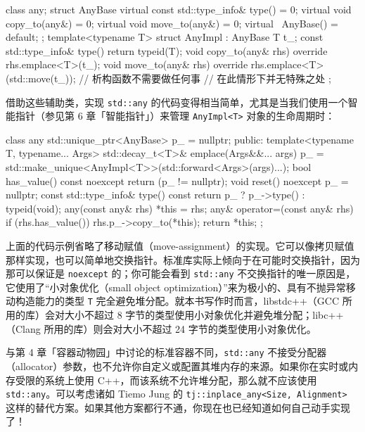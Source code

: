 \begin{codebox}[cpp]
    class any;
    struct AnyBase {
      virtual const std::type_info& type() = 0;
      virtual void copy_to(any&) = 0;
      virtual void move_to(any&) = 0;
      virtual ~AnyBase() = default;
    };
    template<typename T>
    struct AnyImpl : AnyBase {
      T t_;
      const std::type_info& type() {
        return typeid(T);
      }
      void copy_to(any& rhs) override {
        rhs.emplace<T>(t_);
      }
      void move_to(any& rhs) override {
        rhs.emplace<T>(std::move(t_));
      }
      // 析构函数不需要做任何事
      // 在此情形下并无特殊之处
    };
\end{codebox}

借助这些辅助类，实现 \texttt{std::\allowbreak{}any} 的代码变得相当简单，尤其是当我们使用一个智能指针（参见第 6 章「智能指针」）来管理 \texttt{Any\allowbreak{}Impl<\allowbreak{}T>\allowbreak{}} 对象的生命周期时：

\begin{codebox}[cpp]
    class any {
      std::unique_ptr<AnyBase> p_ = nullptr;
      public:
      template<typename T, typename... Args>
      std::decay_t<T>& emplace(Args&&... args) {
        p_ = std::make_unique<AnyImpl<T>>(std::forward<Args>(args)...);
      }
      bool has_value() const noexcept {
        return (p_ != nullptr);
      }
      void reset() noexcept {
        p_ = nullptr;
      }
      const std::type_info& type() const {
        return p_ ? p_->type() : typeid(void);
      }
      any(const any& rhs) {
        *this = rhs;
      }
      any& operator=(const any& rhs) {
        if (rhs.has_value()) {
          rhs.p_->copy_to(*this);
        }
        return *this;
      }
    };
\end{codebox}

上面的代码示例省略了移动赋值（move-assignment）的实现。它可以像拷贝赋值那样实现，也可以简单地交换指针。标准库实际上倾向于在可能时交换指针，因为那可以保证是 \texttt{noexcept} 的；你可能会看到 \texttt{std::\allowbreak{}any} 不交换指针的唯一原因是，它使用了“小对象优化（small object optimization）”来为极小的、具有不抛异常移动构造能力的类型 \texttt{T} 完全避免堆分配。就本书写作时而言，libstdc++（GCC 所用的库）会对大小不超过 8 字节的类型使用小对象优化并避免堆分配；libc++（Clang 所用的库）则会对大小不超过 24 字节的类型使用小对象优化。

与第 4 章「容器动物园」中讨论的标准容器不同，\texttt{std::\allowbreak{}any} 不接受分配器（allocator）参数，也不允许你自定义或配置其堆内存的来源。如果你在实时或内存受限的系统上使用 C++，而该系统不允许堆分配，那么就不应该使用 \texttt{std::\allowbreak{}any}。可以考虑诸如 Tiemo Jung 的 \texttt{tj::\allowbreak{}inplace\_\allowbreak{}any<\allowbreak{}Size,\allowbreak{} Alignment>\allowbreak{}} 这样的替代方案。如果其他方案都行不通，你现在也已经知道如何自己动手实现了！

